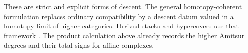 These are strict and explicit forms of descent. The general
homotopy-coherent formulation replaces ordinary compatibility by
a descent datum valued in a homotopy limit of higher categories.
Derived stacks and hypercovers use that framework
\cite[\S1.2.12]{hag}. The product calculation above already records
the higher Amitsur degrees and their total signs for affine
complexes.
